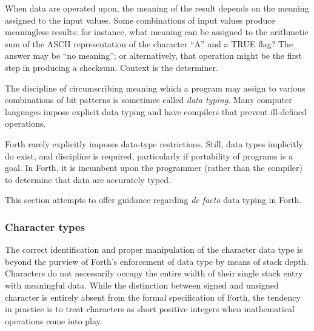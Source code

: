 When data are operated upon, the meaning of the result depends on
the meaning assigned to the input values. Some combinations of input
values produce meaningless results: for instance, what meaning can
be assigned to the arithmetic sum of the ASCII representation of the
character ``A'' and a TRUE flag? The answer may be ``no meaning'';
or alternatively, that operation might be the first step in
producing a checksum. Context is the determiner.

The discipline of circumscribing meaning which a program may assign
to various combinations of bit patterns is sometimes called
\emph{data typing}. Many computer languages impose explicit data
typing and have compilers that prevent ill-defined operations.

Forth rarely explicitly imposes data-type restrictions. Still, data
types implicitly do exist, and discipline is required, particularly
if portability of programs is a goal. In Forth, it is incumbent upon
the programmer (rather than the compiler) to determine that data are
accurately typed.

This section attempts to offer guidance regarding \emph{de facto}
data typing in Forth.

\setcounter{subsubsection}{1}
\subsubsection{Character types} %

The correct identification and proper manipulation of the character
data type is beyond the purview of Forth's enforcement of data type
by means of stack depth. Characters do not necessarily occupy the
entire width of their single stack entry with meaningful data. While
the distinction between signed and unsigned character is entirely
absent from the formal specification of Forth, the tendency in
practice is to treat characters as short positive integers when
mathematical operations come into play.

